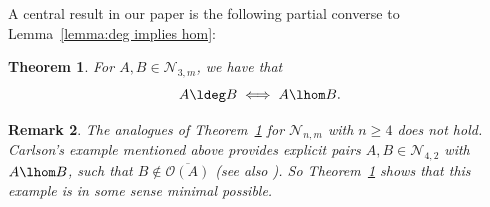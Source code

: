 \documentclass[12pt]{amsart}
\newtheorem{theorem}{\bf Theorem}[section]
\newtheorem{remark}[theorem]{\bf Remark}
\begin{document}
A central result in our paper is the following partial converse to 
Lemma~\ref{lemma:deg implies hom}: 

\begin{theorem}\label{thm:main} 
For $A,B\in \mathcal{N}_{3,m}$, we have that 
\[A\ldeg B \iff A\lhom B.\]
\end{theorem}

\begin{remark}\label{remark:n>3} 
The analogues of Theorem~\ref{thm:main} for $\mathcal{N}_{n,m}$ with 
$n\ge 4$ does not hold. 
Carlson's example \cite{Riedtmann1} mentioned above provides explicit 
pairs $A,B\in \mathcal{N}_{4,2}$ with $A\lhom B$, such that 
$B\notin \overline{\mathcal{O}(A)}$ (see also \cite{DKMV}). 
So Theorem~\ref{thm:main} shows that this example is in some sense minimal 
possible. 
\end{remark}
\end{document}

